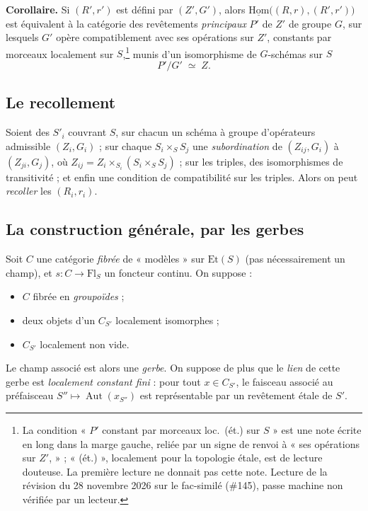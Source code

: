 \documentclass[11pt,a4paper]{article}
\begin{document}
\textbf{Corollaire.} Si $(R', r')$ est défini par $(Z', G')$, alors
$\underline{\mathrm{Hom}}\bigl((R,r),(R',r')\bigr)$ est équivalent à la
catégorie des revêtements \emph{principaux} $P'$ de $Z'$ de groupe $G$, sur
lesquels $G'$ opère compatiblement avec ses opérations sur $Z'$, constants
par morceaux localement sur $S$,\footnote{La condition « $P'$ constant par
morceaux loc.\ (ét.) sur $S$ » est une note écrite en long dans la marge
gauche, reliée par un signe de renvoi à « ses opérations sur $Z'$, » ;
« (ét.) », localement pour la topologie étale, est de lecture douteuse. La
première lecture ne donnait pas cette note. Lecture de la révision du 28 novembre 2026 sur le fac-similé (\#145), passe machine non vérifiée par un lecteur.} munis d'un
isomorphisme de $G$-schémas sur $S$
\[
  P'/G' \;\simeq\; Z .
\]

\subsection*{Le recollement}

Soient des $S'_{i}$ couvrant $S$, sur chacun un schéma à groupe d'opérateurs
admissible $(Z_{i}, G_{i})$ ; sur chaque $S_{i} \times_{S} S_{j}$ une
\emph{subordination} de $(Z_{ij}, G_{i})$ à $(Z_{ji}, G_{j})$, où
$Z_{ij} = Z_{i} \times_{S_{i}} (S_{i} \times_{S} S_{j})$ ; sur les triples, des
isomorphismes de transitivité ; et enfin une condition de compatibilité sur les
triples. Alors on peut \emph{recoller} les $(R_{i}, r_{i})$.

\subsection*{La construction générale, par les gerbes}

Soit $C$ une catégorie \emph{fibrée} de « modèles » sur $\mathrm{Et}(S)$
(pas nécessairement un champ), et $s : C \to \mathrm{Fl}_{S}$ un foncteur
continu. On suppose :

\begin{itemize}
  \item $C$ fibrée en \emph{groupoïdes} ;
  \item deux objets d'un $C_{S'}$ localement isomorphes ;
  \item $C_{S'}$ localement non vide.
\end{itemize}

Le champ associé est alors une \emph{gerbe}. On suppose de plus que le
\emph{lien} de cette gerbe est \emph{localement constant fini} : pour tout
$x \in C_{S'}$, le faisceau associé au préfaisceau $S'' \mapsto
\operatorname{Aut}(x_{S''})$ est représentable par un revêtement étale de
$S'$.
\end{document}
